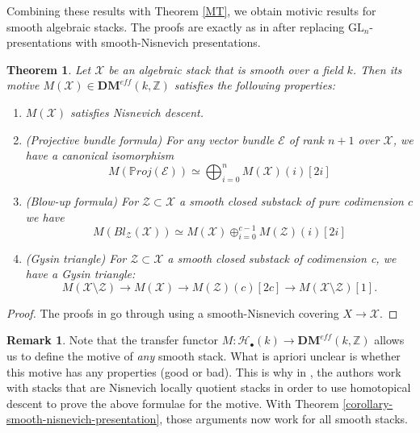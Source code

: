 \documentclass[10pt]{amsart}
\theoremstyle{plain}
\newtheorem{theorem}[thm]{Theorem}
\theoremstyle{definition}
\newtheorem{remark}[thm]{Remark}
\newcommand{\Proj}{{\P roj}}
\newcommand{\sE}{{\mathcal E}}
\newcommand{\sH}{{\mathcal H}}
\newcommand{\sX}{{\mathcal X}}
\newcommand{\sZ}{{\mathcal Z}}
\renewcommand{\P}{{\mathbb P}}
\newcommand{\Z}{{\mathbb Z}}
\newcommand{\DM}[2]{\mathbf{DM}_{#2}^{\mathit{eff}}(#1)}
\begin{document}
Combining these results with Theorem \ref{MT}, we obtain motivic
results for smooth algebraic stacks.  The proofs are exactly as in
\cite{cdh20} after replacing $\mathrm{GL}_n$-presentations with
smooth-Nisnevich presentations.
\begin{theorem}
	Let $\sX$ be an algebraic stack that is smooth over a field $k$. Then its motive $M(\sX)\in \DM{k,\Z}{}$ satisfies the following properties:
	\begin{enumerate}
		\item $M(\sX)$ satisfies Nisnevich descent.
		\item (Projective bundle formula) For any vector bundle $\sE$ of rank $n+1$ over $\sX$, we have a canonical isomorphism
		\[M(\Proj(\sE))\simeq \bigoplus_{i=0}^n M(\sX)(i)[2i]\]
		\item (Blow-up formula) For $\sZ \subset \sX$ a smooth closed substack of pure codimension $c$ we have
		\[M(Bl_{\sZ}(\sX))\simeq M(\sX)\oplus_{i=0}^{c-1} M(\sZ)(i)[2i]\]
		\item (Gysin triangle) For $\sZ \subset \sX$ a smooth closed substack of codimension c, we have a Gysin triangle:
		\[M(\sX \setminus \sZ)\rightarrow M(\sX)\rightarrow M(\sZ)(c)[2c] \rightarrow M(\sX \setminus \sZ)[1].\]
	\end{enumerate}
\end{theorem}
\begin{proof}
	The proofs in \cite[\S 4]{cdh20} go through using a smooth-Nisnevich covering $X\rightarrow\sX$.
\end{proof}

\begin{remark}
	Note that the transfer functor $M: \sH_{\bullet}(k)\rightarrow \DM{k,\Z}{}$ allows us to define the motive of \textit{any} smooth stack. What is apriori unclear is whether this motive has any properties (good or bad). This is why in \cite{cdh20}, the authors work with stacks that are Nisnevich locally quotient stacks in order to use homotopical descent to prove the above formulae for the motive. With Theorem \ref{corollary-smooth-nisnevich-presentation}, those arguments now work for all smooth stacks.
\end{remark}


\end{document}
